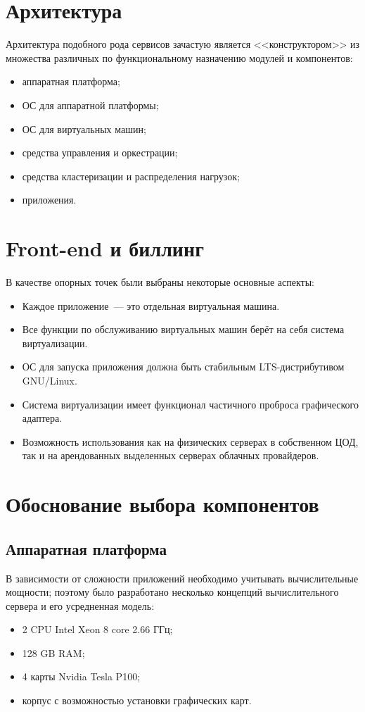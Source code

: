 \documentclass[10pt, a5paper]{article}
\begin{document}
\section*{Архитектура}

Архитектура подобного рода сервисов зачастую является <<конструктором>> из множества различных по функциональному назначению модулей и компонентов:
\begin{itemize}
\item аппаратная платформа;
\item ОС для аппаратной платформы;
\item ОС для виртуальных машин;
\item средства управления и оркестрации;
\item средства кластеризации и распределения нагрузок;
\item приложения.
\end{itemize}

\section*{Front-end и биллинг}

В качестве опорных точек были выбраны некоторые основные аспекты:
\begin{itemize}
\item Каждое приложение~--- это отдельная виртуальная машина.
\item Все функции по обслуживанию виртуальных машин берёт на себя система виртуализации.
\item ОС для запуска приложения должна быть стабильным LTS-дистрибутивом GNU/Linux.
\item Система виртуализации имеет функционал частичного проброса графического адаптера.
\item Возможность использования как на физических серверах в собственном ЦОД, так и на арендованных выделенных серверах облачных провайдеров.
\end{itemize}
\section*{Обоснование выбора компонентов}

\subsection*{Аппаратная платформа} 
В зависимости от сложности приложений необходимо учитывать вычислительные мощности; поэтому было разработано несколько концепций вычислительного сервера и его усредненная модель:
\begin{itemize}
\item 2 CPU Intel Xeon 8 core 2.66 ГГц; 
\item 128 GB RAM;
\item 4 карты Nvidia Tesla P100;
\item корпус с возможностью установки графических карт.
\end{itemize}
\end{document}
